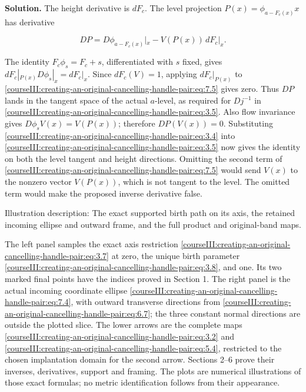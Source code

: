 \textbf{Solution.} The height derivative is \(dF_c\). The level projection \(P(x)=\phi_{a-F_c(x)}x\) has derivative

\begin{equation}
DP=D\phi_{a-F_c(x)}|_x
      -V(P(x))\,dF_c|_x.
 \label{courseIII:creating-an-original-cancelling-handle-pair:eq:7.5}
\end{equation}

The identity \(F_c\phi_s=F_c+s\), differentiated with \(s\) fixed, gives \(dF_c|_{P(x)}D\phi_s|_x=dF_c|_x\). Since \(dF_c(V)=1\), applying \(dF_c|_{P(x)}\) to \eqref{courseIII:creating-an-original-cancelling-handle-pair:eq:7.5} gives zero. Thus \(DP\) lands in the tangent space of the actual \(a\)-level, as required for \(Dj^{-1}\) in \eqref{courseIII:creating-an-original-cancelling-handle-pair:eq:3.5}. Also flow invariance gives \(D\phi_s V(x)=V(P(x))\); therefore \(DP(V(x))=0\). Substituting \eqref{courseIII:creating-an-original-cancelling-handle-pair:eq:3.4} into \eqref{courseIII:creating-an-original-cancelling-handle-pair:eq:3.5} now gives the identity on both the level tangent and height directions. Omitting the second term of \eqref{courseIII:creating-an-original-cancelling-handle-pair:eq:7.5} would send \(V(x)\) to the nonzero vector \(V(P(x))\), which is not tangent to the level. The omitted term would make the proposed inverse derivative false.

Illustration description: The exact supported birth path on its axis, the retained incoming ellipse and outward frame, and the full product and original-band maps.

The left panel samples the exact axis restriction \eqref{courseIII:creating-an-original-cancelling-handle-pair:eq:3.7} at zero, the unique birth parameter \eqref{courseIII:creating-an-original-cancelling-handle-pair:eq:3.8}, and one. Its two marked final points have the indices proved in Section 1. The right panel is the actual incoming coordinate ellipse \eqref{courseIII:creating-an-original-cancelling-handle-pair:eq:7.4}, with outward transverse directions from \eqref{courseIII:creating-an-original-cancelling-handle-pair:eq:6.7}; the three constant normal directions are outside the plotted slice. The lower arrows are the complete maps \eqref{courseIII:creating-an-original-cancelling-handle-pair:eq:3.2} and \eqref{courseIII:creating-an-original-cancelling-handle-pair:eq:5.4}, restricted to the chosen implantation domain for the second arrow. Sections 2--6 prove their inverses, derivatives, support and framing. The plots are numerical illustrations of those exact formulas; no metric identification follows from their appearance.
